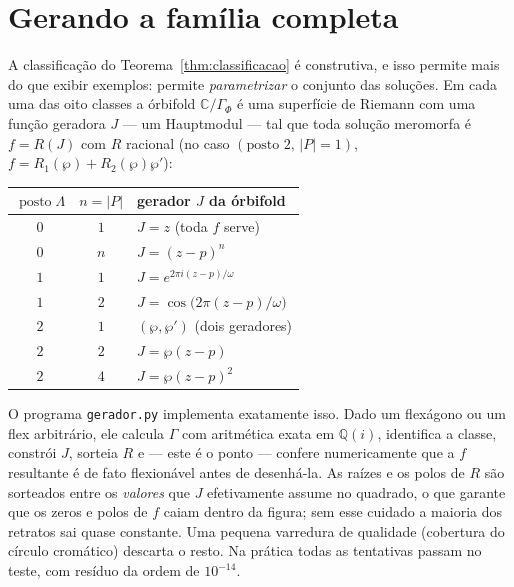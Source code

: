 \documentclass[11pt,a4paper]{article}
\theoremstyle{plain}
\theoremstyle{definition}
\theoremstyle{remark}
\newcommand{\C}{\mathbb{C}}
\newcommand{\Q}{\mathbb{Q}}
\begin{document}
\section{Gerando a família completa}\label{sec:gerador}

A classificação do Teorema~\ref{thm:classificacao} é construtiva, e isso permite
mais do que exibir exemplos: permite \emph{parametrizar} o conjunto das
soluções. Em cada uma das oito classes a órbifold $\C/\Gamma_\Phi$ é uma
superfície de Riemann com uma função geradora $J$ --- um Hauptmodul --- tal que
toda solução meromorfa é $f=R(J)$ com $R$ racional (no caso
$(\text{posto }2,\,|P|=1)$, $f=R_1(\wp)+R_2(\wp)\wp'$):
\begin{center}
\renewcommand{\arraystretch}{1.25}
\begin{tabular}{ccl}
\toprule
$\operatorname{posto}\Lambda$ & $n=|P|$ & gerador $J$ da órbifold\\
\midrule
$0$ & $1$ & $J=z$ (toda $f$ serve)\\
$0$ & $n$ & $J=(z-p)^n$\\
$1$ & $1$ & $J=e^{2\pi i(z-p)/\omega}$\\
$1$ & $2$ & $J=\cos\bigl(2\pi (z-p)/\omega\bigr)$\\
$2$ & $1$ & $(\wp,\wp')$ (dois geradores)\\
$2$ & $2$ & $J=\wp(z-p)$\\
$2$ & $4$ & $J=\wp(z-p)^2$\\
\bottomrule
\end{tabular}
\end{center}

O programa \texttt{gerador.py} implementa exatamente isso. Dado um flexágono ou
um flex arbitrário, ele calcula $\Gamma$ com aritmética exata em $\Q(i)$,
identifica a classe, constrói $J$, sorteia $R$ e --- este é o ponto --- confere
numericamente que a $f$ resultante é de fato flexionável antes de desenhá-la. As
raízes e os polos de $R$ são sorteados entre os \emph{valores} que $J$
efetivamente assume no quadrado, o que garante que os zeros e polos de $f$ caiam
dentro da figura; sem esse cuidado a maioria dos retratos sai quase constante.
Uma pequena varredura de qualidade (cobertura do círculo cromático) descarta o
resto. Na prática todas as tentativas passam no teste, com resíduo da ordem de
$10^{-14}$.
\end{document}

